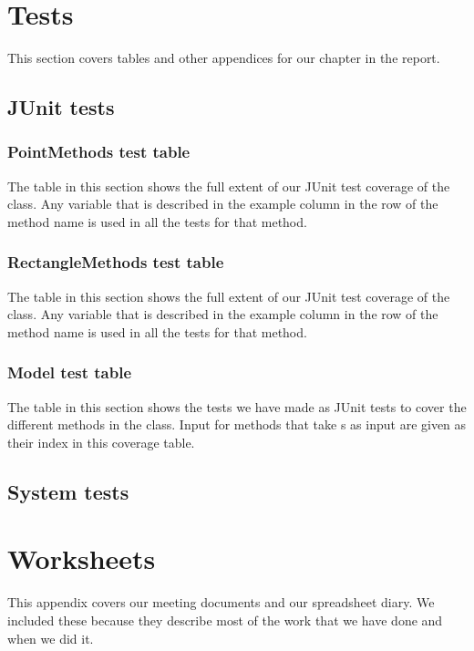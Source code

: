 \appendix
\addappheadtotoc
\chapter{Tests}
This section covers tables and other appendices for our  chapter in
the report.
\section{JUnit tests}
\label{APP-TE-JU}
\subsection{PointMethods test table}
\label{APP-TE-JU-PM}
The table in this section shows the full extent of our JUnit test coverage of
the  class. Any variable that is described in the
example column in the row of the method name is used in all the tests for that
method.


\pagebreak
\subsection{RectangleMethods test table}
\label{APP-TE-JU-RM}
The table in this section shows the full extent of our JUnit test coverage of
the  class. Any variable that is described in the
example column in the row of the method name is used in all the tests for that
method.


\pagebreak
\subsection{Model test table}
\label{APP-TE-JU-MO}
The table in this section shows the tests we have made as JUnit tests to cover
the different methods in the  class. Input for methods that take
s as input are given as their index in this coverage table.



\pagebreak
\section{System tests}
\label{APP-TE-ST}



\chapter{Worksheets}
\label{APP-WS}
This appendix covers our meeting documents and our spreadsheet diary. We
included these because they describe most of the work that we have done and when
we did it.

